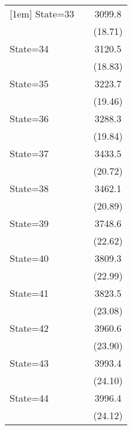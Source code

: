 {\begin{longtable}{l*{2}{c}}
[1em]
State=33            &                     &      3099.8\sym{***}\\
                    &                     &     (18.71)         \\
[1em]
State=34            &                     &      3120.5\sym{***}\\
                    &                     &     (18.83)         \\
[1em]
State=35            &                     &      3223.7\sym{***}\\
                    &                     &     (19.46)         \\
[1em]
State=36            &                     &      3288.3\sym{***}\\
                    &                     &     (19.84)         \\
[1em]
State=37            &                     &      3433.5\sym{***}\\
                    &                     &     (20.72)         \\
[1em]
State=38            &                     &      3462.1\sym{***}\\
                    &                     &     (20.89)         \\
[1em]
State=39            &                     &      3748.6\sym{***}\\
                    &                     &     (22.62)         \\
[1em]
State=40            &                     &      3809.3\sym{***}\\
                    &                     &     (22.99)         \\
[1em]
State=41            &                     &      3823.5\sym{***}\\
                    &                     &     (23.08)         \\
[1em]
State=42            &                     &      3960.6\sym{***}\\
                    &                     &     (23.90)         \\
[1em]
State=43            &                     &      3993.4\sym{***}\\
                    &                     &     (24.10)         \\
[1em]
State=44            &                     &      3996.4\sym{***}\\
                    &                     &     (24.12)         \\

\end{longtable}}
